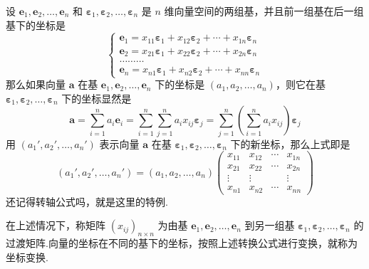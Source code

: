 设 $\bm{e}_1, \bm{e}_2, \ldots, \bm{e}_n$ 和
$\bm{\varepsilon}_1, \bm{\varepsilon}_2, \ldots,
\bm{\varepsilon}_n$ 是 $n$
维向量空间的两组基，并且前一组基在后一组基下的坐标是
\[ \left\{ \begin{array}{l}
     \bm{e}_1 = x_{11} \bm{\varepsilon}_1 + x_{12}
     \bm{\varepsilon}_2 + \cdots + x_{1 n} \bm{\varepsilon}_n\\
     \bm{e}_2 = x_{21} \bm{\varepsilon}_1 + x_{22}
     \bm{\varepsilon}_2 + \cdots + x_{2 n} \bm{\varepsilon}_n\\
     \ldots \ldots \ldots\\
     \bm{e}_n = x_{n 1} \bm{\varepsilon}_1 + x_{n 2}
     \bm{\varepsilon}_2 + \cdots + x_{n n} \bm{\varepsilon}_n
   \end{array} \right. \]
那么如果向量 $\bm{a}$ 在基 $\bm{e}_1, \bm{e}_2,
\ldots, \bm{e}_n$ 下的坐标是 $(a_1, a_2, \ldots,
a_n)$，则它在基 $\bm{\varepsilon}_1, \bm{\varepsilon}_2,
\ldots, \bm{\varepsilon}_n$ 下的坐标显然是
\[ \bm{a}= \sum_{i = 1}^n a_i \bm{e}_i = \sum_{i = 1}^n \sum_{j =
   1}^n a_i x_{i j} \bm{\varepsilon}_j = \sum_{j = 1}^n \left( \sum_{i =
   1}^n a_i x_{i j} \right) \bm{\varepsilon}_j \]
用 $(a_1', a_2', \ldots, a_n')$ 表示向量 $\bm{a}$ 在基
$\bm{\varepsilon}_1, \bm{\varepsilon}_2, \ldots,
\bm{\varepsilon}_n$ 下的新坐标，那么上式即是
\[ (a_1', a_2', \ldots, a_n') = (a_1, a_2, \ldots, a_n)
   \left(\begin{array}{cccc}
     x_{11} & x_{12} & \cdots & x_{1 n}\\
     x_{21} & x_{22} & \cdots & x_{2 n}\\
     \vdots & \vdots &  & \vdots\\
     x_{n 1} & x_{n 2} & \cdots & x_{n n}
   \end{array}\right) \]
还记得转轴公式吗，就是这里的特例.

\begin{definition}
  在上述情况下，称矩阵 $(x_{i j})_{n \times n}$ 为由基
  $\bm{e}_1, \bm{e}_2, \ldots, \bm{e}_n$ 到另一组基
  $\bm{\varepsilon}_1, \bm{\varepsilon}_2, \ldots,
  \bm{\varepsilon}_n$
  的过渡矩阵.向量的坐标在不同的基下的坐标，按照上述转换公式进行变换，就称为坐标变换.
\end{definition}




